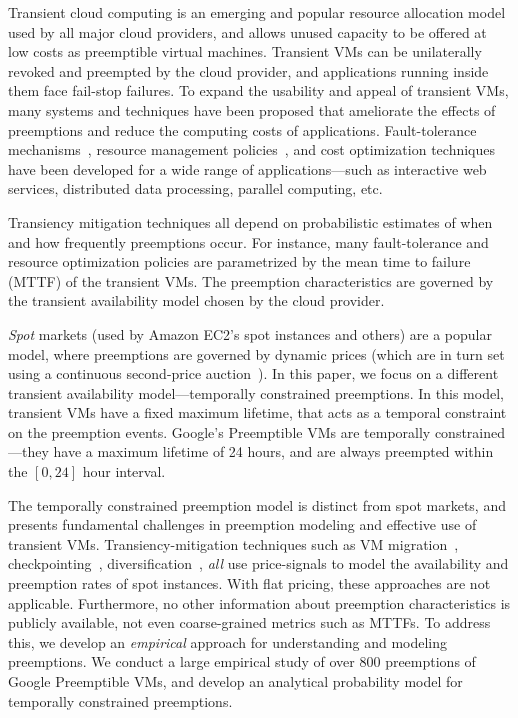 \documentclass[sigconf]{acmart} %
\begin{document}
Transient cloud computing is an emerging and popular resource allocation model used by all major cloud providers, and allows unused capacity to be offered at low costs as preemptible virtual machines.
Transient VMs can be unilaterally revoked and preempted by the cloud provider, and applications running inside them face fail-stop failures.
To expand the usability and appeal of transient VMs, many systems and techniques have been proposed that  ameliorate the effects of preemptions and reduce the computing costs of applications. 
Fault-tolerance mechanisms~\cite{spotcheck, marathe2014exploiting}, resource management policies~\cite{exosphere, conductor}, and cost optimization techniques~\cite{dubois2016optispot, shastri2017hotspot} have been developed for a wide range of applications---such as interactive web services, distributed data processing, parallel computing, etc.

Transiency mitigation techniques all depend on probabilistic estimates of when and how frequently preemptions occur.
For instance, many fault-tolerance and resource optimization policies are parametrized by the mean time to failure (MTTF) of the transient VMs. 
The preemption characteristics are governed by the transient availability model chosen by the cloud provider.

\emph{Spot} markets (used by Amazon EC2's spot instances and others) are a popular model, where preemptions are governed by dynamic prices (which are in turn set using a continuous second-price auction~\cite{spot-pricing2}). 
In this paper, we focus on a different transient availability model---temporally constrained preemptions.
In this model, transient VMs have a fixed maximum lifetime, that acts as a temporal constraint on the preemption events. 
Google's Preemptible VMs are temporally constrained---they have a maximum lifetime of 24 hours, and are always preempted within the $[0,24]$ hour interval.

The temporally constrained preemption model is distinct from spot markets, and presents fundamental challenges in preemption modeling and effective use of transient VMs. 
Transiency-mitigation techniques such as VM migration~\cite{spotcheck}, checkpointing~\cite{flint, marathe2014exploiting}, diversification~\cite{exosphere}, \emph{all} use price-signals to model the availability and preemption rates of spot instances. 
With flat pricing, these approaches are not applicable. 
Furthermore, no other information about preemption characteristics is publicly available, not even coarse-grained metrics such as MTTFs. 
To address this, we develop an \emph{empirical} approach for understanding and modeling preemptions. 
We conduct a large empirical study of over 800 preemptions of Google Preemptible VMs, and develop an analytical probability model for temporally constrained preemptions. 
\end{document}
